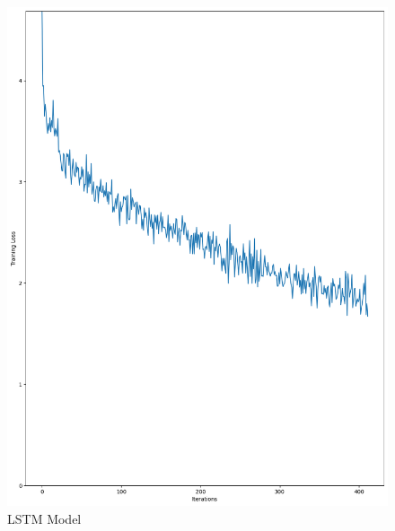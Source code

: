 \documentclass{article}
\begin{document}
\begin{figure}[htbp]
\begin{minipage}[b]{0.2\textwidth}
        \includegraphics[width=\textwidth]{img/LSTM_learning.png}
        \caption{LSTM Model}
        \label{fig:lstm}
    \end{minipage}
    \hfill
    \begin{minipage}[b]{0.2\textwidth}
        \centering

\end{minipage}
\end{figure}
\end{document}

